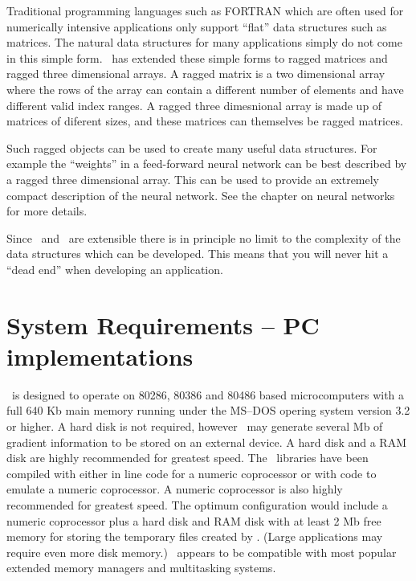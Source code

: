 \documentclass[12pt]{book}
\begin{document}

Traditional programming languages such as FORTRAN which are often
used for numerically intensive applications only support
 ``flat'' data structures such as matrices. The natural
data structures for many applications simply do not come in this
simple form.  \AD\ has extended these simple forms to ragged matrices
and ragged three dimensional arrays.  A ragged matrix  is
a two dimensional array where the rows of the array can contain a 
different number of elements and have different valid index ranges.
A ragged three dimesnional array is made up of matrices of diferent 
sizes, and these matrices can themselves be ragged matrices.

Such ragged objects can be used to create many useful data structures.
For example the ``weights'' in a feed-forward neural network
can be best described by a ragged three dimensional array. This can be used to
provide an extremely compact description of the neural
network. See the chapter on neural networks for more details.

Since \cplus\ and \AD\ are extensible there
is in principle no limit to the complexity of the data structures
which can be developed. This means that you will never hit a ``dead end''
when developing an application.
\endchapter

\htmlnewfile 
\section{System Requirements -- PC implementations}
\AD\ is designed to operate on 80286, 80386 and 80486 based microcomputers
with a full 640 Kb main memory 
running under the MS--DOS opering system version 3.2 or higher.
A hard disk is
not required, however \AD\ may generate several Mb of gradient information
to be stored on an external device. A hard disk and a RAM disk are highly
recommended for greatest speed. The \AD\ libraries have been compiled with
either in line code for a numeric coprocessor or with code to emulate
a numeric coprocessor. A numeric coprocessor is also highly recommended
for greatest speed. 
The optimum configuration would include a numeric coprocessor plus a hard
disk and RAM disk with at least 2 Mb free memory for storing the temporary
files created by \AD.  (Large applications may require even more disk
memory.)
\AD\ appears to be compatible with most popular extended memory managers and
multitasking systems.
\end{document}
